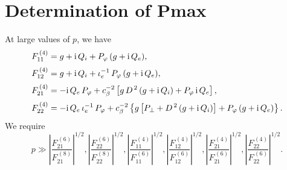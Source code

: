 \documentclass[12pt,prb,aps,notitlepage]{revtex4-1}
\begin{document}
 \section{Determination of Pmax}
 At large values of $p$, we have
 \begin{align}
 F_{11}^{\,(4)} &= g + {\rm i}\,Q_i + P_\varphi\,(g+{\rm i}\,Q_e),\\[0.5ex]
 F_{12}^{\,(4)} &= g+{\rm i}\,Q_i + \iota_e^{-1}\,P_\varphi\,(g+{\rm i}\,Q_e),\\[0.5ex]
 F_{21}^{\,(4)} &= - {\rm i}\,Q_e\,P_\varphi + c_\beta^{-2}\left[g\,D^{\,2}\,(g+{\rm i}\,Q_i) + P_\varphi\,{\rm i}\,Q_e\right],\\[0.5ex]
 F_{22}^{\,(4)} &= -{\rm i}\,Q_e\,\iota_e^{-1}\,P_\varphi + c_\beta^{-2}\left\{g\left[P_\perp + D^{\,2}\,(g+{\rm i}\,Q_i)\right]
 + P_\varphi\,(g+{\rm i}\,Q_e)\right\}.
 \end{align}
 We require
 \begin{equation}
 p\gg \left|\frac{F_{21}^{\,(6)}}{F_{21}^{\,(8)}}\right|^{1/2}, \left|\frac{F_{22}^{\,(6)}}{F_{22}^{\,(8)}}\right|^{1/2}, 
 \left|\frac{F_{11}^{\,(4)}}{F_{11}^{\,(6)}}\right|^{1/2},\left|\frac{F_{12}^{\,(4)}}{F_{12}^{\,(6)}}\right|^{1/2},\left|\frac{F_{21}^{\,(4)}}{F_{21}^{\,(6)}}\right|^{1/2},
 \left|\frac{F_{22}^{\,(4)}}{F_{22}^{\,(6)}}\right|^{1/2}.
 \end{equation}
\end{document}

